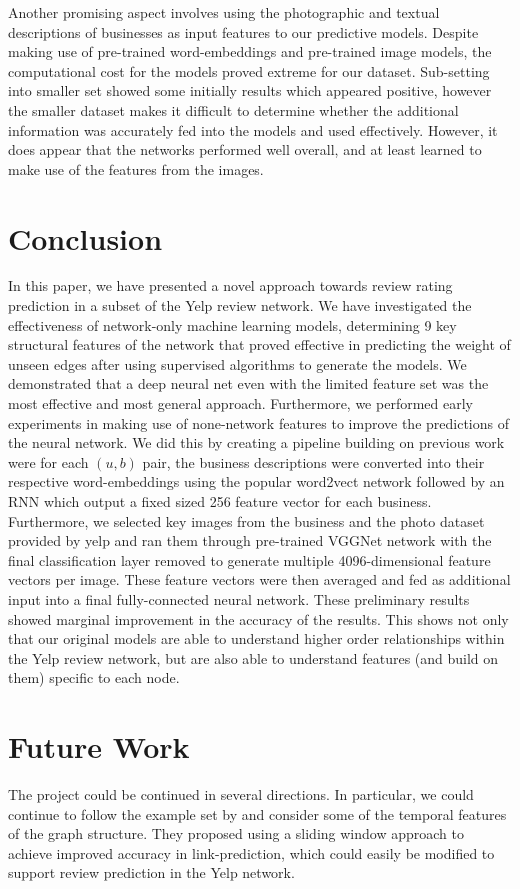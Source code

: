 \documentclass[letterpaper, 10 pt, conference]{ieeeconf}  %
\begin{document}
Another promising aspect involves using the photographic and textual descriptions of businesses as input features to our predictive models. Despite making use of pre-trained word-embeddings and pre-trained image models, the computational cost for the models proved extreme for our dataset. Sub-setting into smaller set showed some initially results which appeared positive, however the smaller dataset makes it difficult to determine whether the additional information was accurately fed into the models and used effectively. However, it does appear that the networks performed well overall, and at least learned to make use of the features from the images.

\section{Conclusion}
In this paper, we have presented a novel approach towards review rating prediction in a subset of the Yelp review network. We have investigated the effectiveness of network-only machine learning models, determining 9 key structural features of the network that proved effective in predicting the weight of unseen edges after using supervised algorithms to generate the models. We demonstrated that a deep neural net even with the limited feature set was the most effective and most general approach. Furthermore, we performed early experiments in making use of none-network features to improve the predictions of the neural network. We did this by creating a pipeline building on previous work were for each $(u,b)$ pair, the business descriptions were converted into their respective word-embeddings using the popular word2vect network followed by an RNN which output a fixed sized 256 feature vector for each business. Furthermore, we selected key images from the business and the photo dataset provided by yelp and ran them through pre-trained VGGNet network with the final classification layer removed to generate multiple 4096-dimensional feature vectors per image. These feature vectors were then averaged and fed as additional input into a final fully-connected neural network. These preliminary results showed marginal improvement in the accuracy of the results. This shows not only that our original models are able to understand higher order relationships within the Yelp review network, but are also able to understand features (and build on them) specific to each node.


\section{Future Work}
The project could be continued in several directions. In particular, we could continue to follow the example set by \cite{PintrestProject} and consider some of the temporal features of the graph structure. They proposed using a sliding window approach to achieve improved accuracy in link-prediction, which could easily be modified to support review prediction in the Yelp network.
\end{document}
